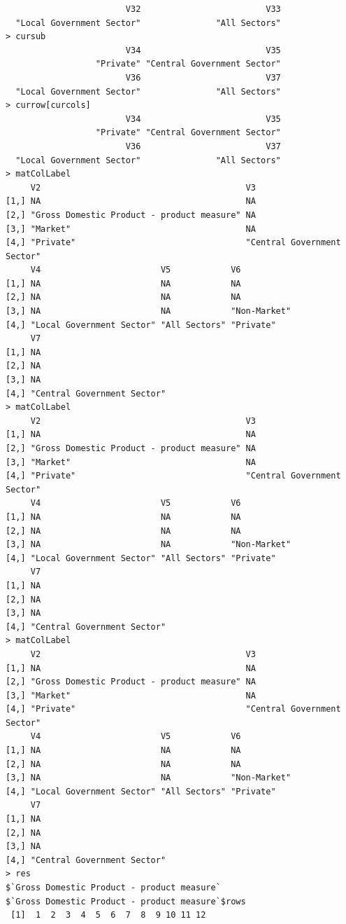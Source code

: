 \documentclass[a4paper]{article}
\begin{document}
\begin{verbatim}
                        V32                         V33 
  "Local Government Sector"               "All Sectors" 
> cursub 
                        V34                         V35 
                  "Private" "Central Government Sector" 
                        V36                         V37 
  "Local Government Sector"               "All Sectors" 
> currow[curcols] 
                        V34                         V35 
                  "Private" "Central Government Sector" 
                        V36                         V37 
  "Local Government Sector"               "All Sectors" 
> matColLabel 
     V2                                         V3                         
[1,] NA                                         NA                         
[2,] "Gross Domestic Product - product measure" NA                         
[3,] "Market"                                   NA                         
[4,] "Private"                                  "Central Government Sector"
     V4                        V5            V6          
[1,] NA                        NA            NA          
[2,] NA                        NA            NA          
[3,] NA                        NA            "Non-Market"
[4,] "Local Government Sector" "All Sectors" "Private"   
     V7                         
[1,] NA                         
[2,] NA                         
[3,] NA                         
[4,] "Central Government Sector"
> matColLabel 
     V2                                         V3                         
[1,] NA                                         NA                         
[2,] "Gross Domestic Product - product measure" NA                         
[3,] "Market"                                   NA                         
[4,] "Private"                                  "Central Government Sector"
     V4                        V5            V6          
[1,] NA                        NA            NA          
[2,] NA                        NA            NA          
[3,] NA                        NA            "Non-Market"
[4,] "Local Government Sector" "All Sectors" "Private"   
     V7                         
[1,] NA                         
[2,] NA                         
[3,] NA                         
[4,] "Central Government Sector"
> matColLabel 
     V2                                         V3                         
[1,] NA                                         NA                         
[2,] "Gross Domestic Product - product measure" NA                         
[3,] "Market"                                   NA                         
[4,] "Private"                                  "Central Government Sector"
     V4                        V5            V6          
[1,] NA                        NA            NA          
[2,] NA                        NA            NA          
[3,] NA                        NA            "Non-Market"
[4,] "Local Government Sector" "All Sectors" "Private"   
     V7                         
[1,] NA                         
[2,] NA                         
[3,] NA                         
[4,] "Central Government Sector"
> res 
$`Gross Domestic Product - product measure`
$`Gross Domestic Product - product measure`$rows
 [1]  1  2  3  4  5  6  7  8  9 10 11 12


\end{verbatim}
\end{document}
